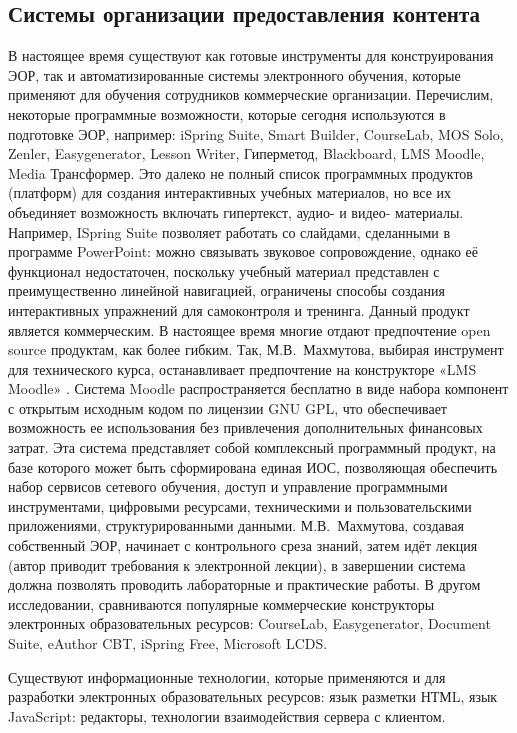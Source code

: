 \subsection{Системы организации предоставления контента}
В настоящее время существуют как готовые инструменты для конструирования ЭОР, так и автоматизированные системы электронного обучения, которые применяют для обучения сотрудников коммерческие организации.
Перечислим, некоторые программные возможности, которые сегодня используются в подготовке ЭОР, например: iSpring Suite, Smart Builder, CourseLab, MOS Solo, Zenler, Easygenerator, Lesson Writer, Гиперметод, Blackboard, LMS Moodle, Media Трансформер.
Это далеко не полный список программных продуктов (платформ) для создания интерактивных учебных материалов, но все их объединяет возможность включать гипертекст, аудио- и видео- материалы. Например, ISpring Suite позволяет работать со слайдами, сделанными в программе PowerPoint: можно связывать звуковое сопровождение, однако её функционал недостаточен, поскольку учебный материал представлен с преимущественно линейной навигацией, ограничены способы создания интерактивных упражнений для самоконтроля и тренинга. Данный продукт является коммерческим. В настоящее время многие отдают предпочтение open source продуктам, как более гибким. Так, М.В.~Махмутова, выбирая инструмент для технического курса, останавливает предпочтение на конструкторе «LMS Moodle» \cite{mahmutova19, larin}. 
Система Moodle распространяется бесплатно в виде набора компонент с открытым исходным кодом по лицензии GNU GPL, что обеспечивает возможность ее использования без привлечения дополнительных финансовых затрат. Эта система представляет собой комплексный программный продукт, на базе которого может быть сформирована единая ИОС, позволяющая обеспечить набор сервисов сетевого обучения, доступ и управление программными инструментами, цифровыми ресурсами, техническими и пользовательскими приложениями, структурированными данными. М.В.~Махмутова, создавая собственный ЭОР, начинает с контрольного среза знаний, затем идёт лекция (автор приводит требования к электронной лекции), в завершении система должна позволять проводить лабораторные и практические работы.
В другом исследовании\cite{dementeva17}, сравниваются популярные коммерческие конструкторы электронных образовательных ресурсов: CourseLab, Easygenerator, Document Suite, eAuthor CBT, iSpring Free, Microsoft LCDS.

Существуют информационные технологии, которые применяются и для разработки электронных образовательных ресурсов: язык разметки НТМL, язык JavaScript: редакторы, технологии взаимодействия сервера с клиентом\cite[С. 154.]{dementeva17}.

